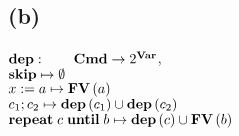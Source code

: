 \documentclass[12pt,a4paper]{article}
\begin{document}
	\subsection*{(b)}
	
	\indent\indent $\text{\textbf{dep}}: \qquad \text{\textbf{Cmd}}\rightarrow 2^{\text{\textbf{Var}}}$,\\
	\indent $\text{\textbf{skip}}\mapsto\emptyset$\\
	\indent $x:=a\mapsto \text{\textbf{FV}}\left( a\right)$\\
	\indent $c_1;c_2\mapsto \text{\textbf{dep}}\left( c_1\right) \cup\text{\textbf{dep}}\left( c_2\right)$\\
	\indent $\text{\textbf{repeat}}\; c\; \text{\textbf{until}}\; b \mapsto \text{\textbf{dep}}\left( c\right) \cup \text{\textbf{FV}}\left( b\right)$
\end{document}

